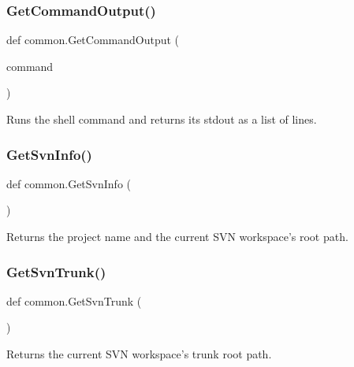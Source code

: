 \subsubsection{\texorpdfstring{GetCommandOutput()}{GetCommandOutput()}}
{\footnotesize\ttfamily def common.\+Get\+Command\+Output (\begin{DoxyParamCaption}\item[{}]{command }\end{DoxyParamCaption})}

\begin{DoxyVerb}Runs the shell command and returns its stdout as a list of lines.\end{DoxyVerb}
 \mbox{\label{namespacecommon_a312d07161b76d965fee6a61e464e283f}} 
\subsubsection{\texorpdfstring{GetSvnInfo()}{GetSvnInfo()}}
{\footnotesize\ttfamily def common.\+Get\+Svn\+Info (\begin{DoxyParamCaption}{ }\end{DoxyParamCaption})}

\begin{DoxyVerb}Returns the project name and the current SVN workspace's root path.\end{DoxyVerb}
 \mbox{\label{namespacecommon_a9e6483972a8dc0a6a274cbcee69564b0}} 
\subsubsection{\texorpdfstring{GetSvnTrunk()}{GetSvnTrunk()}}
{\footnotesize\ttfamily def common.\+Get\+Svn\+Trunk (\begin{DoxyParamCaption}{ }\end{DoxyParamCaption})}

\begin{DoxyVerb}Returns the current SVN workspace's trunk root path.\end{DoxyVerb}
 \mbox{\label{namespacecommon_a8219bb529336fc3f0ef8222a5ed48222}} 
